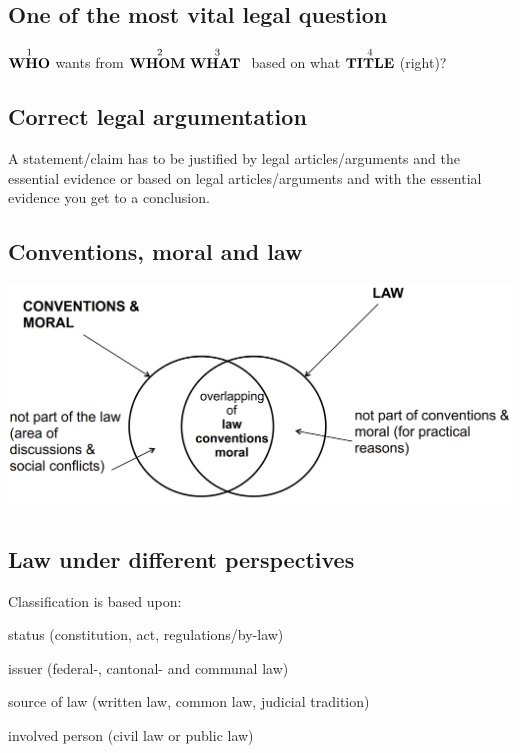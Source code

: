 \subsection{One of the most vital legal question}
$\overset{1}{\text{\textbf{WHO}}}$ wants from $ \overset{2}{\text{\textbf{WHOM} }} \overset{3}{\text{\textbf{WHAT} }}$ based on what $\overset{4}{\text{\textbf{TITLE}}}$ (right)?

\subsection{Correct legal argumentation}
A statement/claim has to be justified by legal articles/arguments and the essential evidence or based on legal articles/arguments and with the essential evidence you get to a conclusion.

\subsection{Conventions, moral and law}
\includegraphics[width=1\linewidth]{images/conventions_moral_and_law}

\subsection{Law under different perspectives}
Classification is based upon:
\begin{compactitem}
	\item status (constitution, act, regulations/by-law)
	\item issuer (federal-, cantonal- and communal law)
	\item source of law (written law, common law, judicial tradition)
	\item involved person (civil law or public law)
\end{compactitem}

